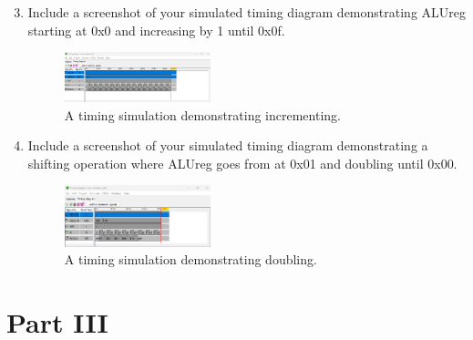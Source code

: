 \documentclass{article}
\begin{document}
\begin{enumerate}
\setcounter{enumi}{2}
\item Include a screenshot of your simulated timing diagram demonstrating ALUreg starting at 0x0 and increasing by 1 until 0x0f.

\begin{figure}[ht!]
    \centering
    \includegraphics[width=0.4\textwidth]{lab4_timing_plus_one.png}
    \caption{A timing simulation demonstrating incrementing.}
    \label{f:timing_plus_one}
\end{figure}

\item Include a screenshot of your simulated timing diagram demonstrating a shifting operation where ALUreg goes from at 0x01 and doubling until 0x00.

\begin{figure}[ht!]
    \centering
    \includegraphics[width=0.4\textwidth]{lab4_timing_times_two.png}
    \caption{A timing simulation demonstrating doubling.}
    \label{f:timing_double}
\end{figure}
\end{enumerate}

\section*{Part III}
\end{document}
